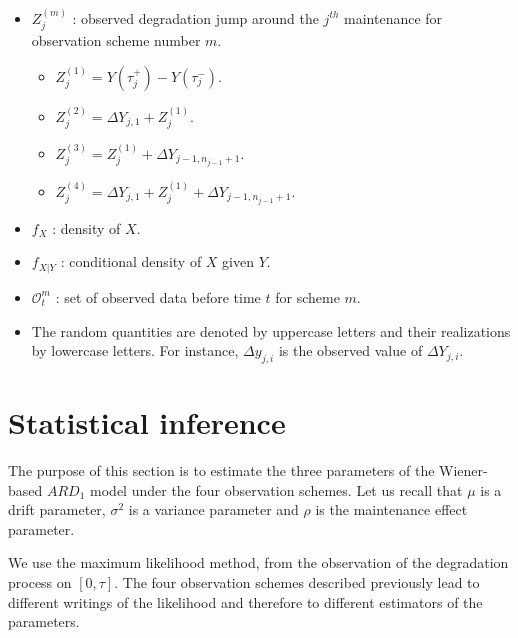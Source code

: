 \begin{itemize}
\item $Z_j^{(m)}$ :  observed degradation jump around the $j^{th}$ maintenance for observation scheme number $m$.

\begin{itemize}[label=\textbullet]

\item $Z_j^{(1)}=Y(\tau_j^+)-Y(\tau_j^-)$. 

\item $Z_j^{(2)}=\Delta Y_{j,1}+Z_j^{(1)}$.

\item $Z_j^{(3)}=Z_j^{(1)}+\Delta Y_{j-1,n_{j-1}+1}$.

\item $Z_j^{(4)}=\Delta Y_{j,1}+Z_j^{(1)}+\Delta Y_{j-1,n_{j-1}+1}$. 
\end{itemize}


\item $f_X$ : density of $X$.

\item $f_{X|Y}$ : conditional density of $X$ given $Y$.

\item $\mathcal{O}^m_{t}$ :  set of observed data before time $t$ for scheme $m$.

\item The random quantities are denoted by uppercase letters and their realizations by lowercase letters. For instance, $\Delta y_{j,i}$ is the observed value of $\Delta Y_{j,i}$.

\end{itemize}


\section{Statistical inference}
\label{section:stat}

The purpose of this section is to estimate the three parameters of the Wiener-based  $ARD_1$ model under the four observation schemes. Let us recall that $\mu$ is a drift parameter, $\sigma^2$ is a variance parameter and $\rho$ is the maintenance effect parameter.

We use the maximum likelihood method, from the observation of the degradation process on $[0,\tau]$.
The four observation schemes described previously lead to different writings of the likelihood and therefore to different estimators of the parameters.

